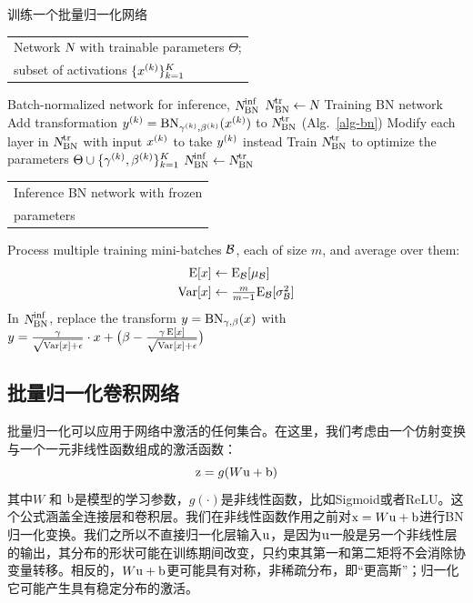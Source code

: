 \documentclass[twocolumn]{article}
\begin{document}
\begin{algorithm}
\caption{训练一个批量归一化网络}
\label{alg-train}
\begin{algorithmic}[1]
\REQUIRE 
\begin{tabular}[t]{@{}l}
Network $\norig$ with trainable  parameters $\Theta$;\\
 subset of activations $\{x^\kk\}_{k=1}^K$
 \end{tabular}
\ENSURE  Batch-normalized network  for inference, $\ninf$
\STATE $\ntrain\leftarrow \norig$ \quad \COMMENT Training BN network
\STATE 
Add transformation $y^\kk = \BN{x^\kk}{\gamma^\kk,\beta^\kk}$  to $\ntrain$ (Alg.~\ref{alg-bn})
\STATE
Modify each layer in $\ntrain$ with input $x^\kk$ to take $y^\kk$ instead
\ENDFOR
\STATE
Train $\ntrain$ to optimize the parameters $\Theta\cup 
\{\gamma^\kk, \beta^\kk\}_{k=1}^K$
\STATE \vspace{.03in}
$\ninf\leftarrow\ntrain$\quad \begin{tabular}[t]{@{}l}\COMMENT Inference BN network with frozen\\ \COMMENT parameters \end{tabular}
\STATE {}
\STATE Process multiple training mini-batches  $\setB$, each of size $m$, and average over them:
\vspace{-.1in}
\begin{align*}
\E[x] &\leftarrow \E_\setB[\mu_\setB]\\
 \Var[x] &\leftarrow \textstyle \frac{m}{m-1}\E_\setB[\sigma_\setB^2]
 \end{align*}
\STATE 
\vspace{-.1in}
In $\ninf$, replace the transform $y=\BN{x}{\gamma,\beta}$ with\, $y = \frac{\gamma}{\sqrt{\Var[x]+\epsilon}}\cdot x + \big(\beta - \frac{\gamma\,\E[x]}{\sqrt{\Var[x]+\epsilon}}\big)$
\ENDFOR
\end{algorithmic}
\end{algorithm}

\subsection{批量归一化卷积网络}
\label{sec-conv}

批量归一化可以应用于网络中激活的任何集合。在这里，我们考虑由一个仿射变换与一个一元非线性函数组成的激活函数：$$\vz = g(W\vu+\vb)$$其中$W$ 和 $\vb$是模型的学习参数，$g(\cdot)$是非线性函数，比如Sigmoid或者ReLU。这个公式涵盖全连接层和卷积层。我们在非线性函数作用之前对$\vx=W\vu+\vb$进行BN归一化变换。我们之所以不直接归一化层输入$\vu$，是因为$\vu$一般是另一个非线性层的输出，其分布的形状可能在训练期间改变，只约束其第一和第二矩将不会消除协变量转移。相反的，$W\vu+\vb$更可能具有对称，非稀疏分布，即“更高斯”；归一化它可能产生具有稳定分布的激活。
\end{document}
